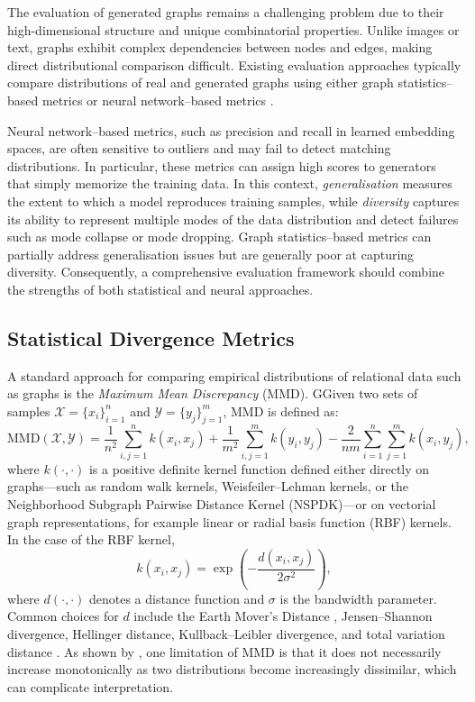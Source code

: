 The evaluation of generated graphs remains a challenging problem due to their high-dimensional structure and unique combinatorial properties. Unlike images or text, graphs exhibit complex dependencies between nodes and edges, making direct distributional comparison difficult. Existing evaluation approaches typically compare distributions of real and generated graphs using either graph statistics--based metrics \citep{you2018graphrnn,liao2019gran,obrady2021evaluation} or neural network--based metrics \citep{kynkaanniemi2019improved,naeem2020reliable,heusel2017gans}.  

Neural network--based metrics, such as precision and recall in learned embedding spaces, are often sensitive to outliers and may fail to detect matching distributions. In particular, these metrics can assign high scores to generators that simply memorize the training data. In this context, \emph{generalisation} measures the extent to which a model reproduces training samples, while \emph{diversity} captures its ability to represent multiple modes of the data distribution and detect failures such as mode collapse or mode dropping. Graph statistics--based metrics can partially address generalisation issues but are generally poor at capturing diversity. Consequently, a comprehensive evaluation framework should combine the strengths of both statistical and neural approaches.

\subsection{Statistical Divergence Metrics}
A standard approach for comparing empirical distributions of relational data such as
graphs is the \emph{Maximum Mean Discrepancy} (MMD). GGiven two sets of samples
\(\mathcal{X} = \{x_i\}_{i=1}^n\) and
\(\mathcal{Y} = \{y_j\}_{j=1}^m\), MMD is defined as:
\[
\mathrm{MMD}(\mathcal{X},\mathcal{Y}) =
\frac{1}{n^2}\sum_{i,j=1}^n k(x_i,x_j)
+ \frac{1}{m^2}\sum_{i,j=1}^m k(y_i,y_j)
- \frac{2}{nm}\sum_{i=1}^n\sum_{j=1}^m k(x_i,y_j),
\]
where \(k(\cdot,\cdot)\) is a positive definite kernel function defined either
directly on graphs—such as random walk kernels, Weisfeiler--Lehman kernels, or
the Neighborhood Subgraph Pairwise Distance Kernel (NSPDK)—or on vectorial graph
representations, for example linear or radial basis function (RBF) kernels.
In the case of the RBF kernel,
\[
k(x_i, x_j) = \exp\!\left(-\frac{d(x_i, x_j)}{2\sigma^2}\right),
\]
where \(d(\cdot,\cdot)\) denotes a distance function and \(\sigma\) is the
bandwidth parameter. Common choices for \(d\) include the Earth Mover’s Distance
\citep{rubner2000emd}, Jensen--Shannon divergence, Hellinger distance, Kullback--Leibler
divergence, and total variation distance \citep{scheffe1947convergence}. As shown by
\citet{obrady2021evaluation}, one limitation of MMD is that it does not necessarily
increase monotonically as two distributions become increasingly dissimilar, which
can complicate interpretation.

